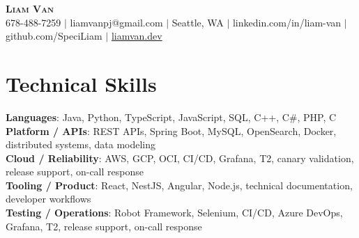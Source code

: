 \documentclass[letterpaper,11pt]{article}
\begin{document}

%
\begin{center}
    \textbf{\Huge \scshape Liam Van} \\ \vspace{1pt}
    \small 678-488-7259 $|$ liamvanpj@gmail.com $|$ Seattle, WA $|$
    linkedin.com/in/liam-van $|$ github.com/SpeciLiam $|$ \href{https://liamvan.dev}{liamvan.dev}

\end{center}

\section{Technical Skills}
 \begin{itemize}[leftmargin=0.15in, label={}]
    \small{\item{
     \textbf{Languages}{: Java, Python, TypeScript, JavaScript, SQL, C++, C\#, PHP, C} \\
     \textbf{Platform / APIs}{: REST APIs, Spring Boot, MySQL, OpenSearch, Docker, distributed systems, data modeling} \\
     \textbf{Cloud / Reliability}{: AWS, GCP, OCI, CI/CD, Grafana, T2, canary validation, release support, on-call response} \\
     \textbf{Tooling / Product}{: React, NestJS, Angular, Node.js, technical documentation, developer workflows} \\
     \textbf{Testing / Operations}{: Robot Framework, Selenium, CI/CD, Azure DevOps, Grafana, T2, release support, on-call response} \\
    }}
 \end{itemize}
%
\end{document}
